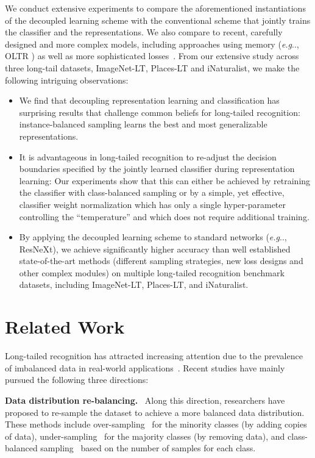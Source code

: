 \documentclass[dvipsnames]{article} \usepackage{iclr2020_conference, times}
\makeatletter
\DeclareRobustCommand\onedot{\futurelet\@let@token\@onedot}
\def\@onedot{\ifx\@let@token.\else.\null\fi\xspace}
\def\eg{\emph{e.g}\onedot} \def\Eg{\emph{E.g}\onedot}
\newcommand{\header}[1]{\noindent\textbf{#1.}~}
\newcommand{\uniform}{instance-balanced\xspace}
\makeatother
\begin{document}
We conduct extensive experiments to compare the aforementioned instantiations of the decoupled learning scheme with the conventional scheme that jointly trains the classifier and the representations. We also compare to recent, carefully designed and more complex models, including approaches using memory (\eg, OLTR \citep{liu2019large}) as well as more sophisticated losses~\citep{cui2019class}. From our extensive study across three long-tail datasets, ImageNet-LT, Places-LT and iNaturalist, we make the following intriguing observations:

\begin{itemize}
    \item We find that decoupling representation learning and classification has surprising results that challenge common beliefs for long-tailed recognition:  \uniform sampling learns the best and most generalizable representations.
    \item It is advantageous in long-tailed recognition to re-adjust the decision boundaries specified by the jointly learned classifier during representation learning: 
    {Our experiments show that this can either be achieved by retraining the classifier with class-balanced sampling or by a simple, yet effective, classifier weight normalization which has only a single hyper-parameter controlling the ``temperature'' and which does not require additional training.} 
    \item By applying the decoupled learning scheme to standard networks (\eg, ResNeXt), we achieve significantly higher accuracy than well established state-of-the-art  methods (different sampling strategies, new loss designs and other complex modules) on  multiple long-tailed recognition benchmark datasets, including ImageNet-LT, Places-LT, and iNaturalist. 
\end{itemize}


 

\section{Related Work}
\label{sec:related}

Long-tailed recognition has attracted increasing attention due to the prevalence of imbalanced data in real-world applications~\citep{wang2017learning, zhou2017places, mahajan2018exploring, Zhong_2019_CVPR, gupta2019lvis}. Recent studies have mainly pursued the following three directions:

\header{Data distribution re-balancing} Along this direction, researchers have proposed to re-sample the dataset to achieve a more balanced data distribution. These methods include over-sampling~\citep{chawla2002smote, han2005borderline} for the minority classes (by adding copies of data), under-sampling~\citep{undersampling} for the majority classes (by removing data), and class-balanced sampling~\citep{shen2016relay, mahajan2018exploring} based on the number of samples for each class. 
\end{document}
